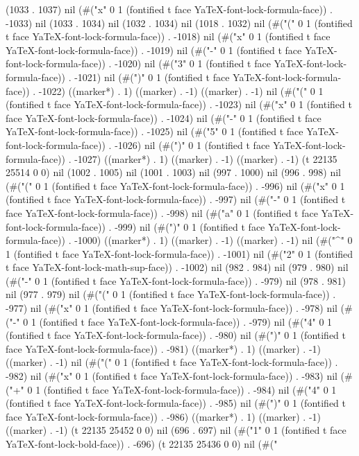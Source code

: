 (1033 . 1037) nil (#("x" 0 1 (fontified t face YaTeX-font-lock-formula-face)) . -1033) nil (1033 . 1034) nil (1032 . 1034) nil (1018 . 1032) nil (#("(" 0 1 (fontified t face YaTeX-font-lock-formula-face)) . -1018) nil (#("x" 0 1 (fontified t face YaTeX-font-lock-formula-face)) . -1019) nil (#("-" 0 1 (fontified t face YaTeX-font-lock-formula-face)) . -1020) nil (#("3" 0 1 (fontified t face YaTeX-font-lock-formula-face)) . -1021) nil (#(")" 0 1 (fontified t face YaTeX-font-lock-formula-face)) . -1022) ((marker*) . 1) ((marker) . -1) ((marker) . -1) nil (#("(" 0 1 (fontified t face YaTeX-font-lock-formula-face)) . -1023) nil (#("x" 0 1 (fontified t face YaTeX-font-lock-formula-face)) . -1024) nil (#("-" 0 1 (fontified t face YaTeX-font-lock-formula-face)) . -1025) nil (#("5" 0 1 (fontified t face YaTeX-font-lock-formula-face)) . -1026) nil (#(")" 0 1 (fontified t face YaTeX-font-lock-formula-face)) . -1027) ((marker*) . 1) ((marker) . -1) ((marker) . -1) (t 22135 25514 0 0) nil (1002 . 1005) nil (1001 . 1003) nil (997 . 1000) nil (996 . 998) nil (#("(" 0 1 (fontified t face YaTeX-font-lock-formula-face)) . -996) nil (#("x" 0 1 (fontified t face YaTeX-font-lock-formula-face)) . -997) nil (#("-" 0 1 (fontified t face YaTeX-font-lock-formula-face)) . -998) nil (#("a" 0 1 (fontified t face YaTeX-font-lock-formula-face)) . -999) nil (#(")" 0 1 (fontified t face YaTeX-font-lock-formula-face)) . -1000) ((marker*) . 1) ((marker) . -1) ((marker) . -1) nil (#("^" 0 1 (fontified t face YaTeX-font-lock-formula-face)) . -1001) nil (#("2" 0 1 (fontified t face YaTeX-font-lock-math-sup-face)) . -1002) nil (982 . 984) nil (979 . 980) nil (#("-" 0 1 (fontified t face YaTeX-font-lock-formula-face)) . -979) nil (978 . 981) nil (977 . 979) nil (#("(" 0 1 (fontified t face YaTeX-font-lock-formula-face)) . -977) nil (#("x" 0 1 (fontified t face YaTeX-font-lock-formula-face)) . -978) nil (#("-" 0 1 (fontified t face YaTeX-font-lock-formula-face)) . -979) nil (#("4" 0 1 (fontified t face YaTeX-font-lock-formula-face)) . -980) nil (#(")" 0 1 (fontified t face YaTeX-font-lock-formula-face)) . -981) ((marker*) . 1) ((marker) . -1) ((marker) . -1) nil (#("(" 0 1 (fontified t face YaTeX-font-lock-formula-face)) . -982) nil (#("x" 0 1 (fontified t face YaTeX-font-lock-formula-face)) . -983) nil (#("+" 0 1 (fontified t face YaTeX-font-lock-formula-face)) . -984) nil (#("4" 0 1 (fontified t face YaTeX-font-lock-formula-face)) . -985) nil (#(")" 0 1 (fontified t face YaTeX-font-lock-formula-face)) . -986) ((marker*) . 1) ((marker) . -1) ((marker) . -1) (t 22135 25452 0 0) nil (696 . 697) nil (#("1" 0 1 (fontified t face YaTeX-font-lock-bold-face)) . -696) (t 22135 25436 0 0) nil (#("%